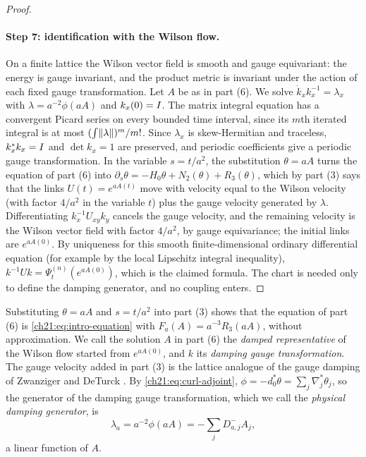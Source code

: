 \begin{proof}
\paragraph{Step 7: identification with the Wilson flow.}
On a finite lattice the Wilson vector field is smooth and gauge equivariant: the energy is gauge invariant, and the product metric is invariant under the action of each fixed gauge transformation. Let $A$ be as in part (6). We solve $\dot k_xk_x^{-1}=\lambda_x$ with $\lambda=a^{-2}\phi(aA)$ and $k_x(0)=I$. The matrix integral equation has a convergent Picard series on every bounded time interval, since its $m$th iterated integral is at most $(\int\lVert \lambda\rVert)^m/m!$. Since $\lambda_x$ is skew-Hermitian and traceless, $k_x^*k_x=I$ and $\det k_x=1$ are preserved, and periodic coefficients give a periodic gauge transformation. In the variable $s=t/a^2$, the substitution $\theta=aA$ turns the equation of part (6) into $\partial_s\theta=-H_0\theta+N_2(\theta)+R_3(\theta)$, which by part (3) says that the links $U(t)=e^{aA(t)}$ move with velocity equal to the Wilson velocity (with factor $4/a^2$ in the variable $t$) plus the gauge velocity generated by $\lambda$. Differentiating $k_x^{-1}U_{xy}k_y$ cancels the gauge velocity, and the remaining velocity is the Wilson vector field with factor $4/a^2$, by gauge equivariance; the initial links are $e^{aA(0)}$. By uniqueness for this smooth finite-dimensional ordinary differential equation (for example by the local Lipschitz integral inequality), $k^{-1}Uk=\Psi^{(n)}_t(e^{aA(0)})$, which is the claimed formula. The chart is needed only to define the damping generator, and no coupling enters.
\end{proof}

Substituting $\theta=aA$ and $s=t/a^2$ into part (3) shows that the equation of part (6) is \eqref{ch21:eq:intro-equation} with $F_a(A)=a^{-3}R_3(aA)$, without approximation. We call the solution $A$ in part (6) the \emph{damped representative} of the Wilson flow started from $e^{aA(0)}$, and $k$ its \emph{damping gauge transformation}. The gauge velocity added in part (3) is the lattice analogue of the gauge damping of Zwanziger \cite{Zwanziger1981} and DeTurck \cite{DeTurck1983}. By \eqref{ch21:eq:curl-adjoint}, $\phi=-d_0^*\theta=\sum_j\nabla_j^*\theta_j$, so the generator of the damping gauge transformation, which we call the \emph{physical damping generator}, is
\begin{equation}\label{ch21:eq:lattice-damping-generator}
 \lambda_a=a^{-2}\phi(aA)=-\sum_jD_{a,j}^-A_j ,
\end{equation}
a linear function of $A$.

